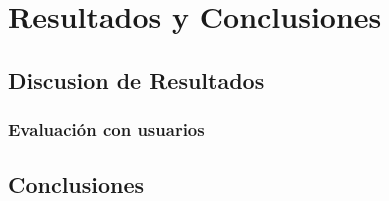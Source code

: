 \newpage
\thispagestyle{sectioned}
\chapter{Resultados y Conclusiones}

\section{Discusion de Resultados}

\subsection{Evaluación con usuarios}

\section{Conclusiones}


